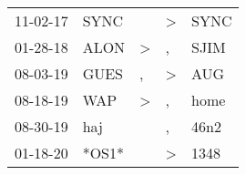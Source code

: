 \begin{supertabular}{p{0.07\textwidth}p{0.06\textwidth}p{0.02\textwidth}p{0.02\textwidth}p{0.06\textwidth}}
          11-02-17\textsuperscript{} &           SYNC\textsuperscript{} &                  &     \textgreater &           SYNC\textsuperscript{} \\
          01-28-18\textsuperscript{} &           ALON\textsuperscript{} &     \textgreater &                , &           SJIM\textsuperscript{} \\
          08-03-19\textsuperscript{} &           GUES\textsuperscript{} &                , &     \textgreater &            AUG\textsuperscript{} \\
          08-18-19\textsuperscript{} &            WAP\textsuperscript{} &     \textgreater &                , &           home\textsuperscript{} \\
          08-30-19\textsuperscript{} &            haj\textsuperscript{} &                  &                , &           46n2\textsuperscript{} \\
          01-18-20\textsuperscript{} &                            *OS1* &                  &     \textgreater &           1348\textsuperscript{} \\
\end{supertabular}
